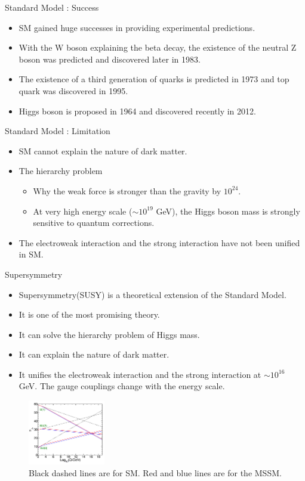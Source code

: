 \documentclass[mathserif,serif]{beamer}
\begin{document}
\begin{frame}{Standard Model : Success}
\begin{itemize}
\item SM gained huge successes in providing experimental predictions.
\item With the W boson explaining the beta decay, the existence of the neutral Z boson was predicted and discovered later in 1983.
\item The existence of a third generation of quarks is predicted in 1973 and top quark was discovered in 1995.
\item Higgs boson is proposed in 1964 and discovered recently in 2012.
\end{itemize}
\end{frame}

\begin{frame}{Standard Model : Limitation}
\begin{itemize}
\item SM cannot explain the nature of dark matter.
\item The hierarchy problem
\begin{itemize}
\item Why the weak force is stronger than the gravity by $10^{24}$.
\item At very high energy scale ($\sim 10^{19}$ GeV), the Higgs boson mass is strongly sensitive to quantum corrections.
\end{itemize}
\item The electroweak interaction and the strong interaction have not been unified in SM.
\end{itemize}
\end{frame}

\begin{frame}{Supersymmetry}
\begin{itemize}
\item Supersymmetry(SUSY) is a theoretical extension of the Standard Model.
\item It is one of the most promising theory.
\item It can solve the hierarchy problem of Higgs mass.
\item It can explain the nature of dark matter.
\item It unifies the electroweak interaction and the strong interaction at $\sim 10^{16}$ GeV. The gauge couplings change with the energy scale.
\end{itemize}
\begin{figure}
\centering
\includegraphics[width=0.3\textwidth]{data/photo/theory/unification.png}
\caption{Black dashed lines are for SM. Red and blue lines are for the MSSM.}
\end{figure}
\end{frame}
\end{document}

